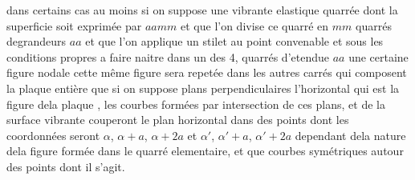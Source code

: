 \documentclass[11pt,a4paper]{article}
\begin{document}


  dans certains cas au moins
si on suppose une   vibrante elastique quarrée dont la superficie
soit exprimée par $aamm$ et que l'on  divise ce
quarré en $mm$ quarrés degrandeurs $aa$ et que l'on applique un stilet
au point convenable et sous les conditions propres a faire naitre dans
un des 4, quarrés  d'etendue $aa$ une certaine figure nodale cette même
figure sera repetée dans les  autres carrés qui composent la plaque
entière   que si on
suppose   plans perpendiculaires   l'horizontal qui est  
 la figure   dela plaque , les courbes formées par  intersection
de ces plans,  et de la surface vibrante couperont le plan 
horizontal dans des points dont les  coordonnées
seront $\alpha$, $\alpha+a$, $\alpha+2a$ \struck{\ill{}} et $\alpha'$, $\alpha'+a$, $\alpha'+2a$ 
\struck{\ill{}}  dependant dela nature dela figure
 formée dans le  quarré elementaire, et que 
courbes  symétriques autour des points dont il s'agit.
\end{document}
